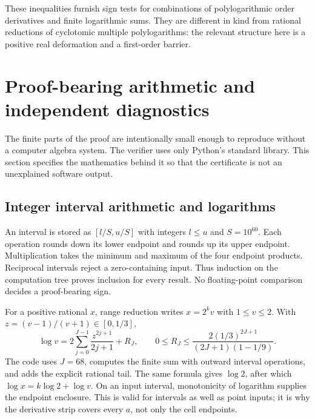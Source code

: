 \documentclass[11pt]{article}
\numberwithin{equation}{section}
\theoremstyle{definition}
\begin{document}
These inequalities furnish sign tests for combinations of polylogarithmic
order derivatives and finite logarithmic sums. They are different in kind
from rational reductions of cyclotomic multiple polylogarithms: the relevant
structure here is a positive real deformation and a first-order barrier.

\section{Proof-bearing arithmetic and independent diagnostics}
\label{sec:certificate}
The finite parts of the proof are intentionally small enough to reproduce
without a computer algebra system. The verifier uses only Python's standard
library. This section specifies the mathematics behind it so that the
certificate is not an unexplained software output.

\subsection{Integer interval arithmetic and logarithms}
An interval is stored as $[l/S,u/S]$ with integers $l\leq u$ and
$S=10^{60}$. Each operation rounds down its lower endpoint and rounds up its
upper endpoint. Multiplication takes the minimum and maximum of the four
endpoint products. Reciprocal intervals reject a zero-containing input.
Thus induction on the computation tree proves inclusion for every result.
No floating-point comparison decides a proof-bearing sign.

For a positive rational $x$, range reduction writes $x=2^k v$ with
$1\leq v\leq2$. With $z=(v-1)/(v+1)\in[0,1/3]$,
\begin{equation}\label{eq:logseries}
 \log v=2\sum_{j=0}^{J-1}\frac{z^{2j+1}}{2j+1}+R_J,
 \qquad
 0\leq R_J\leq
 \frac{2(1/3)^{2J+1}}{(2J+1)(1-1/9)}.
\end{equation}
The code uses $J=68$, computes the finite sum with outward interval
operations, and adds the explicit rational tail. The same formula gives
$\log2$, after which $\log x=k\log2+\log v$. On an input interval,
monotonicity of logarithm supplies the endpoint enclosure. This is valid
for intervals as well as point inputs; it is why the derivative strip
covers every $a$, not only the cell endpoints.
\end{document}
